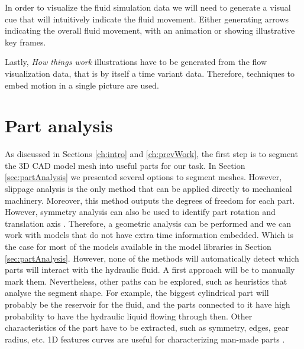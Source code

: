 In order to visualize the fluid simulation data we will need to generate a visual cue that will intuitively indicate the fluid movement.
Either generating arrows indicating the overall fluid movement, with an animation or showing illustrative key frames.

Lastly, \textit{How things work} illustrations have to be generated from the flow visualization data, that is by itself a time variant data.
Therefore, techniques to embed motion in a single picture are used.


\section{Part analysis}

As discussed in Sections \ref{ch:intro} and \ref{ch:prevWork}, the first step is to segment the 3D CAD model mesh into useful parts for our task.
In Section \ref{sec:partAnalysis} we presented several options to segment meshes.
However, slippage analysis \cite{Yi2014} is the only method that can be applied directly to mechanical machinery.
Moreover, this method outputs the degrees of freedom for each part.
However, symmetry analysis can also be used to identify part rotation and translation axis \cite{Mitra2007}.
Therefore, a geometric analysis can be performed and we can work with models that do not have extra time information embedded.
Which is the case for most of the models available in the model libraries in Section \ref{sec:partAnalysis}.
However, none of the methods will automatically detect which parts will interact with the hydraulic fluid.
A first approach will be to manually mark them.
Nevertheless, other paths can be explored, such as heuristics that analyse the segment shape.
For example, the biggest cylindrical part will probably be the reservoir for the fluid, and the parts connected to it have high probability to have the hydraulic liquid flowing through then.
Other characteristics of the part have to be extracted, such as symmetry, edges, gear radius, etc.
1D features curves are useful for characterizing man-made parts \cite{Gal2009}.


